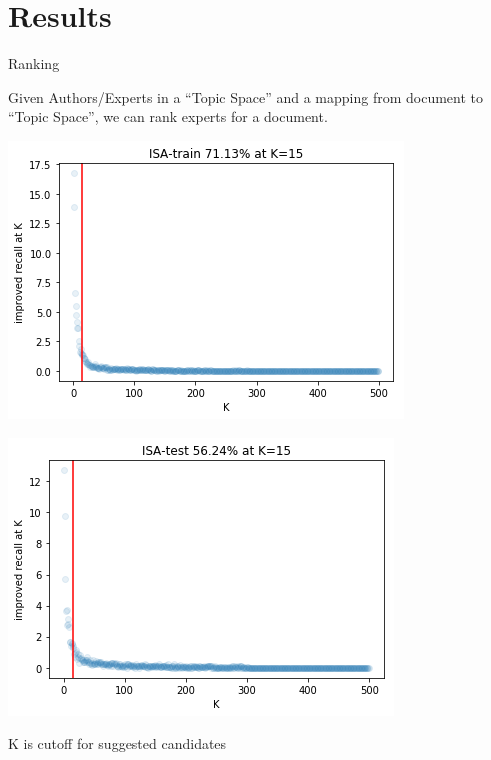 \documentclass[10pt]{beamer}
\begin{document}
\section{Results}

\begin{frame}{Ranking}

  Given Authors/Experts in a ``Topic Space'' and a mapping from document to ``Topic Space'', we can rank experts for a document. %

  \begin{multicols}{2}
    \includegraphics[width=\columnwidth]{./recall-train-isa.png}

    \includegraphics[width=\columnwidth]{./recall-test-isa.png}
  \end{multicols}

  K is cutoff for suggested candidates
\end{frame}
\end{document}
